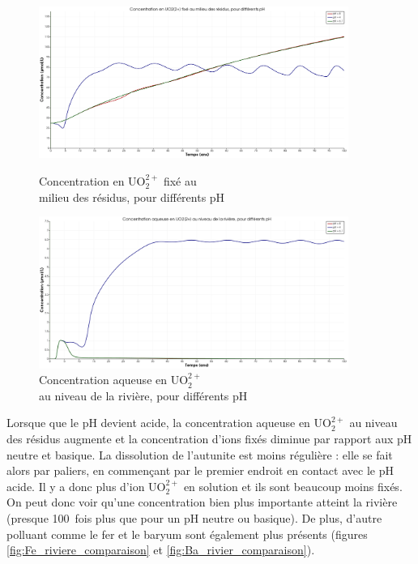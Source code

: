 \documentclass{article}
\begin{document}
\begin{figure}[H]
    \centering
    \begin{minipage}{0.5\textwidth}
        \centering
        \includegraphics[width=0.9\textwidth]{III_B_2_11.png} 
        \caption{Concentration en UO$_2^{2+}$ fixé au \\milieu des résidus, pour différents pH}
        \label{fig:UO2_fixe_residus_comparaison}
    \end{minipage}\hfill
    \begin{minipage}{0.5\textwidth}
        \centering
        \includegraphics[width=0.9\textwidth]{III_B_2_12.png} 
        \caption{Concentration aqueuse en UO$_2^{2+}$ \\au niveau de la rivière, pour différents pH}
        \label{fig:UO2_riviere_comparaison}
    \end{minipage}
\end{figure}


Lorsque que le pH devient acide, la concentration aqueuse en UO$_2^{2+}$ au niveau des résidus augmente et la concentration d’ions fixés diminue par rapport aux pH neutre et basique. La dissolution de l’autunite est moins régulière : elle se fait alors par paliers, en commençant par le premier endroit en contact avec le pH acide. Il y a donc plus d’ion UO$_2^{2+}$ en solution et ils sont beaucoup moins fixés. On peut donc voir qu’une concentration bien plus importante atteint la rivière (presque 100~fois plus que pour un pH neutre ou basique). De plus, d’autre polluant comme le fer et le baryum sont également plus présents (figures \ref{fig:Fe_riviere_comparaison} et \ref{fig:Ba_rivier_comparaison}).
\end{document}

